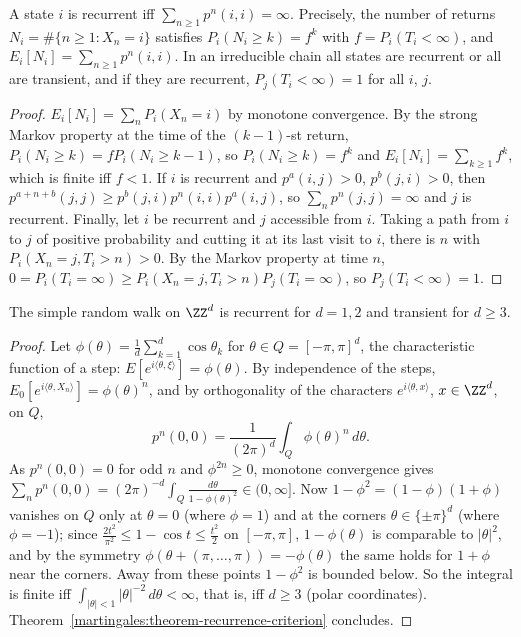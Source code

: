 \begin{theorem}\label{martingales:theorem-recurrence-criterion}
A state $i$ is recurrent iff $\sum_{n \geq 1}p^n(i, i) = \infty$. Precisely, the number of returns $N_i = \#\{n \geq 1 : X_n = i\}$ satisfies $P_i(N_i \geq k) = f^k$ with $f = P_i(T_i < \infty)$, and $E_i[N_i] = \sum_{n \geq 1}p^n(i, i)$.
In an irreducible chain all states are recurrent or all are transient, and if they are recurrent, $P_j(T_i < \infty) = 1$ for all $i$, $j$.
\end{theorem}

\begin{proof}
$E_i[N_i] = \sum_nP_i(X_n = i)$ by monotone convergence. By the strong Markov property at the time of the $(k - 1)$-st return, $P_i(N_i \geq k) = fP_i(N_i \geq k - 1)$, so $P_i(N_i \geq k) = f^k$ and $E_i[N_i] = \sum_{k \geq 1}f^k$, which is
finite iff $f < 1$. If $i$ is recurrent and $p^a(i, j) > 0$, $p^b(j, i) > 0$, then $p^{a+n+b}(j, j) \geq p^b(j, i)p^n(i, i)p^a(i, j)$, so $\sum_np^n(j, j) = \infty$ and $j$ is recurrent. Finally, let $i$ be recurrent and $j$ accessible from $i$. Taking a path from $i$ to $j$ of positive probability and cutting it at its last visit to $i$, there is $n$ with $P_i(X_n = j, T_i > n) > 0$.
By the Markov property at time $n$, $0 = P_i(T_i = \infty) \geq P_i(X_n = j, T_i > n)P_j(T_i = \infty)$, so $P_j(T_i < \infty) = 1$.
\end{proof}

\begin{theorem}[P\'olya]\label{martingales:theorem-polya}
The simple random walk on $\ZZ^d$ is recurrent for $d = 1, 2$ and transient for $d \geq 3$.
\end{theorem}

\begin{proof}
Let $\phi(\theta) = \frac1d\sum_{k=1}^d\cos\theta_k$ for $\theta \in Q = [-\pi, \pi]^d$, the characteristic function of a step: $E[e^{i\langle\theta, \xi\rangle}] = \phi(\theta)$. By independence of the steps, $E_0[e^{i\langle\theta, X_n\rangle}] = \phi(\theta)^n$,
and by orthogonality of the characters $e^{i\langle\theta, x\rangle}$, $x \in \ZZ^d$, on $Q$,
\[
p^n(0, 0) = \frac{1}{(2\pi)^d}\int_Q\phi(\theta)^n\,d\theta.
\]
As $p^n(0, 0) = 0$ for odd $n$ and $\phi^{2n} \geq 0$, monotone convergence gives $\sum_np^n(0, 0) = (2\pi)^{-d}\int_Q\frac{d\theta}{1 - \phi(\theta)^2} \in (0, \infty]$. Now $1 - \phi^2 = (1 - \phi)(1 + \phi)$ vanishes on $Q$ only at
$\theta = 0$ (where $\phi = 1$) and at the corners $\theta \in \{\pm\pi\}^d$ (where $\phi = -1$); since $\frac{2t^2}{\pi^2} \leq 1 - \cos t \leq \frac{t^2}{2}$ on $[-\pi, \pi]$, $1 - \phi(\theta)$ is comparable to $|\theta|^2$, and by the symmetry
$\phi(\theta + (\pi, \ldots, \pi)) = -\phi(\theta)$ the same holds for $1 + \phi$ near the corners. Away from these points $1 - \phi^2$ is bounded below. So the integral is finite iff $\int_{|\theta| < 1}|\theta|^{-2}\,d\theta < \infty$, that is,
iff $d \geq 3$ (polar coordinates). Theorem~\ref{martingales:theorem-recurrence-criterion} concludes.
\end{proof}

